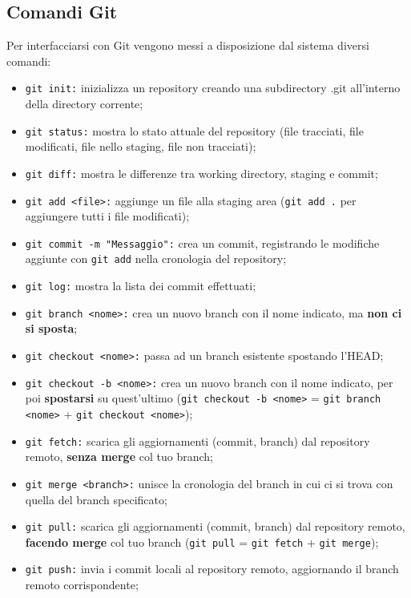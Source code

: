 \documentclass[12pt]{article}
\begin{document}
    \subsection{Comandi Git}
    Per interfacciarsi con Git vengono messi a disposizione dal sistema diversi comandi:
    \begin{itemize}
      \item \texttt{git init:} inizializza un repository creando una subdirectory .git all'interno della directory corrente; 
      \item \texttt{git status:} mostra lo stato attuale del repository (file tracciati, file modificati, file nello staging, file non tracciati);
      \item \texttt{git diff:} mostra le differenze tra working directory, staging e commit;
      \item \texttt{git add <file>:} aggiunge un file alla staging area (\texttt{git add .} per aggiungere tutti i file modificati);
      \item \texttt{git commit -m "Messaggio":} crea un commit, registrando le modifiche aggiunte con \texttt{git add} nella cronologia del repository;
      \item \texttt{git log:} mostra la lista dei commit effettuati;
      \item \texttt{git branch <nome>:} crea un nuovo branch con il nome indicato, ma \textbf{non ci si sposta};
      \item \texttt{git checkout <nome>:} passa ad un branch esistente spostando l'HEAD;
      \item \texttt{git checkout -b <nome>:} crea un nuovo branch con il nome indicato, per poi \textbf{spostarsi} su quest'ultimo (\texttt{git checkout -b <nome>} = \texttt{git branch <nome>} + \texttt{git checkout <nome>});
      \item \texttt{git fetch:} scarica gli aggiornamenti (commit, branch) dal repository remoto, \textbf{senza merge} col tuo branch;
      \item \texttt{git merge <branch>:} unisce la cronologia del branch in cui ci si trova con quella del branch specificato;
      \item \texttt{git pull:} scarica gli aggiornamenti (commit, branch) dal repository remoto, \textbf{facendo merge} col tuo branch (\texttt{git pull} = \texttt{git fetch} + \texttt{git merge});
      \item \texttt{git push:} invia i commit locali al repository remoto, aggiornando il branch remoto corrispondente; 
    \end{itemize}
\end{document}
